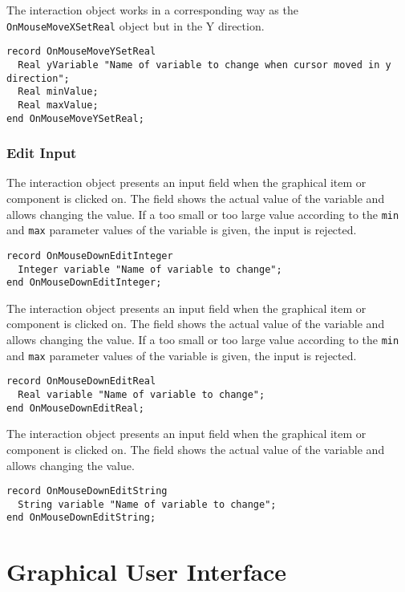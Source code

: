 The  interaction object works in a corresponding way as the \lstinline!OnMouseMoveXSetReal! object but in the Y direction.
\begin{lstlisting}[language=modelica]
record OnMouseMoveYSetReal
  Real yVariable "Name of variable to change when cursor moved in y direction";
  Real minValue;
  Real maxValue;
end OnMouseMoveYSetReal;
\end{lstlisting}

\subsubsection{Edit Input}\label{edit-input}

The  interaction object presents an input field when the graphical item or component is clicked on.
The field shows the actual value of the variable and allows changing the value.
If a too small or too large value according to the \lstinline!min! and \lstinline!max! parameter values of the variable is given, the input is rejected.
\begin{lstlisting}[language=modelica]
record OnMouseDownEditInteger
  Integer variable "Name of variable to change";
end OnMouseDownEditInteger;
\end{lstlisting}

The  interaction object presents an input field when the graphical item or component is clicked on.
The field shows the actual value of the variable and allows changing the value.
If a too small or too large value according to the \lstinline!min! and \lstinline!max! parameter values of the variable is given, the input is rejected.
\begin{lstlisting}[language=modelica]
record OnMouseDownEditReal
  Real variable "Name of variable to change";
end OnMouseDownEditReal;
\end{lstlisting}

The  interaction object presents an input field when the graphical item or component is clicked on.
The field shows the actual value of the variable and allows changing the value.
\begin{lstlisting}[language=modelica]
record OnMouseDownEditString
  String variable "Name of variable to change";
end OnMouseDownEditString;
\end{lstlisting}

\section{Graphical User Interface}\label{annotations-for-the-graphical-user-interface}\label{graphical-user-interface}

